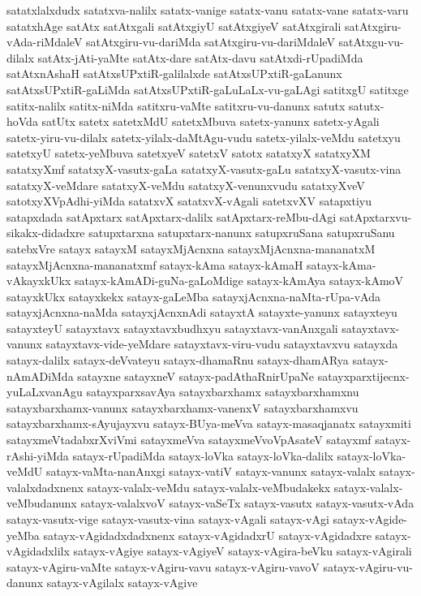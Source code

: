 {satatxlalxdudx
satatxva-nalilx
satatx-vanige
satatx-vanu
satatx-vane
satatx-varu
satatxhAge
satAtx
satAtxgali
satAtxgiyU
satAtxgiyeV
satAtxgirali
satAtxgiru-vAda-riMdaleV
satAtxgiru-vu-dariMda
satAtxgiru-vu-dariMdaleV
satAtxgu-vu-dilalx
satAtx-jAti-yaMte
satAtx-dare
satAtx-davu
satAtxdi-rUpadiMda
satAtxnAshaH
satAtxsUPxtiR-galilalxde
satAtxsUPxtiR-gaLanunx
satAtxsUPxtiR-gaLiMda
satAtxsUPxtiR-gaLuLaLx-vu-gaLAgi
satitxgU
satitxge
satitx-nalilx
satitx-niMda
satitxru-vaMte
satitxru-vu-danunx
satutx
satutx-hoVda
satUtx
satetx
satetxMdU
satetxMbuva
satetx-yanunx
satetx-yAgali
satetx-yiru-vu-dilalx
satetx-yilalx-daMtAgu-vudu
satetx-yilalx-veMdu
satetxyu
satetxyU
satetx-yeMbuva
satetxyeV
satetxV
satotx
satatxyX
satatxyXM
satatxyXmf
satatxyX-vasutx-gaLa
satatxyX-vasutx-gaLu
satatxyX-vasutx-vina
satatxyX-veMdare
satatxyX-veMdu
satatxyX-venunxvudu
satatxyXveV
satotxyXVpAdhi-yiMda
satatxvX
satatxvX-vAgali
satetxvXV
satapxtiyu
satapxdada
satApxtarx
satApxtarx-dalilx
satApxtarx-reMbu-dAgi
satApxtarxvu-sikakx-didadxre
satupxtarxna
satupxtarx-nanunx
satupxruSana
satupxruSanu
satebxVre
satayx
satayxM
satayxMjAcnxna
satayxMjAcnxna-mananatxM
satayxMjAcnxna-mananatxmf
satayx-kAma
satayx-kAmaH
satayx-kAma-vAkayxkUkx
satayx-kAmADi-guNa-gaLoMdige
satayx-kAmAya
satayx-kAmoV
satayxkUkx
satayxkekx
satayx-gaLeMba
satayxjAcnxna-naMta-rUpa-vAda
satayxjAcnxna-naMda
satayxjAcnxnAdi
satayxtA
satayxte-yanunx
satayxteyu
satayxteyU
satayxtavx
satayxtavxbudhxyu
satayxtavx-vanAnxgali
satayxtavx-vanunx
satayxtavx-vide-yeMdare
satayxtavx-viru-vudu
satayxtavxvu
satayxda
satayx-dalilx
satayx-deVvateyu
satayx-dhamaRnu
satayx-dhamARya
satayx-nAmADiMda
satayxne
satayxneV
satayx-padAthaRnirUpaNe
satayxparxtijecnx-yuLaLxvanAgu
satayxparxsavAya
satayxbarxhamx
satayxbarxhamxnu
satayxbarxhamx-vanunx
satayxbarxhamx-vanenxV
satayxbarxhamxvu
satayxbarxhamx-sAyujayxvu
satayx-BUya-meVva
satayx-masaqjanatx
satayxmiti
satayxmeVtadabxrXviVmi
satayxmeVva
satayxmeVvoVpAsateV
satayxmf
satayx-rAshi-yiMda
satayx-rUpadiMda
satayx-loVka
satayx-loVka-dalilx
satayx-loVka-veMdU
satayx-vaMta-nanAnxgi
satayx-vatiV
satayx-vanunx
satayx-valalx
satayx-valalxdadxnenx
satayx-valalx-veMdu
satayx-valalx-veMbudakekx
satayx-valalx-veMbudanunx
satayx-valalxvoV
satayx-vaSeTx
satayx-vasutx
satayx-vasutx-vAda
satayx-vasutx-vige
satayx-vasutx-vina
satayx-vAgali
satayx-vAgi
satayx-vAgide-yeMba
satayx-vAgidadxdadxnenx
satayx-vAgidadxrU
satayx-vAgidadxre
satayx-vAgidadxlilx
satayx-vAgiye
satayx-vAgiyeV
satayx-vAgira-beVku
satayx-vAgirali
satayx-vAgiru-vaMte
satayx-vAgiru-vavu
satayx-vAgiru-vavoV
satayx-vAgiru-vu-danunx
satayx-vAgilalx
satayx-vAgive
}
